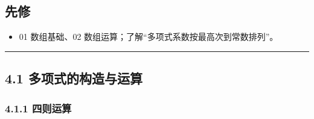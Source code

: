 \subsection{先修}\label{ux5148ux4fee-3}

\begin{itemize}
\tightlist
\item
  01 数组基础、02 数组运算；了解``多项式系数按最高次到常数排列''。
\end{itemize}

\begin{center}\rule{0.5\linewidth}{0.5pt}\end{center}

\subsection{4.1
多项式的构造与运算}\label{ux591aux9879ux5f0fux7684ux6784ux9020ux4e0eux8fd0ux7b97}

\begin{Shaded}
\begin{Highlighting}[]
\OperatorTok{=}\OperatorTok{=}\NormalTok{)}

\OperatorTok{=}\NormalTok{ np.poly1d([}\NormalTok{, }\NormalTok{, }\NormalTok{])}
\NormalTok{))       }
\end{Highlighting}
\end{Shaded}

\subsubsection{4.1.1 四则运算}\label{ux56dbux5219ux8fd0ux7b97}

\begin{Shaded}
\begin{Highlighting}[]
\OperatorTok{=}\NormalTok{ np.poly1d([}\NormalTok{, }\NormalTok{, }\NormalTok{])       }
\OperatorTok{=}\NormalTok{ np.poly1d([}\NormalTok{, }\OperatorTok{{-}}\NormalTok{])         }

\OperatorTok{+}
\OperatorTok{{-}}
\OperatorTok{*}
\OperatorTok{=}\OperatorTok{/}
\end{Highlighting}
\end{Shaded}


